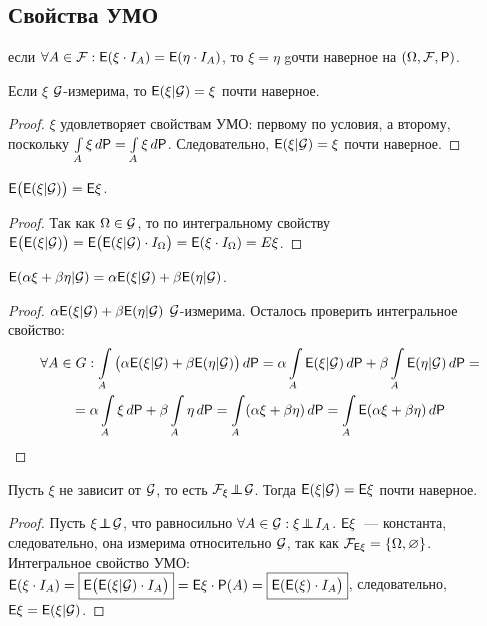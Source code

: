 \subsection*{Свойства УМО}
\setcounter{property}{0}
 если $\forall A \in \F: \E(\xi \cdot I_A) = \E(\eta \cdot I_A)$, то $\xi = \eta$ gочти наверное на $(\Omega, \F, \P)$.
\begin{property}
	Если $\xi$ $\G$-измерима, то $\E(\xi | \G) = \xi$ почти наверное. 
	\begin{proof}
		$\xi$ удовлетворяет свойствам УМО: первому по условия, а второму, поскольку $\int\limits_A \xi \, d\P = \int\limits_A \xi \, d\P$. Следовательно, $\E(\xi | \G) = \xi$ почти наверное.  
	\end{proof}
\end{property}
\begin{property}
	 $\E \big( \E( \xi | \G) \big) = \E\xi$.
	 \begin{proof}
	 	Так как $\Omega \in \G$, то по интегральному свойству $\E \big( \E(\xi | \G) \big) = \E \big( \E(\xi | \G ) \cdot I_\Omega \big) = \E( \xi \cdot I_\Omega) = E\xi$.
	 \end{proof}
\end{property}
\begin{property}[линейность]
	$\E (\alpha \xi + \beta \eta | \G ) = \alpha \E( \xi | \G) + \beta \E(\eta |\G)$.
	\begin{proof}
		$\alpha \E(\xi | \G) + \beta \E(\eta | \G)$ $\G$-измерима. Осталось проверить интегральное свойство:
		\begin{multline*}
			\forall A \in G: \int\limits_A \big( \alpha \E( \xi | \G) + \beta \E( \eta | \G) \big) \, d \P = \alpha \int\limits_A \E( \xi | \G) \, d \P + \beta \int\limits_A \E( \eta | \G ) \, d \P = \\ 
			= \alpha \int\limits_A \xi \, d \P + \beta \int\limits_A \eta \, d \P = \int\limits_A (\alpha \xi + \beta \eta ) \, d\P = \int\limits_A \E( \alpha\xi + \beta\eta) \, d \P
		\end{multline*}
	\end{proof}
\end{property}
\begin{property}
	Пусть $\xi$ не зависит от $\G$, то есть $\F_\xi \indep \G$. Тогда $\E ( \xi | \G) = \E \xi$ почти наверное.
	\begin{proof}
		Пусть $\xi \indep \G$, что равносильно $\forall A \in \G: \xi \indep I_A$. $\E \xi$~--- константа, следовательно, она измерима относительно $\G$, так как $\F_{\E \xi} = \{ \Omega, \varnothing \}$. Интегральное свойство УМО: $\E ( \xi \cdot I_A) = \boxed{\E \big( \E( \xi | \G) \cdot I_A \big)} = \E \xi \cdot \P(A) = \boxed{\E(\E(\xi) \cdot I_A \big)}$, следовательно, $\E \xi = \E( \xi | \G)$.
	\end{proof}
\end{property}
